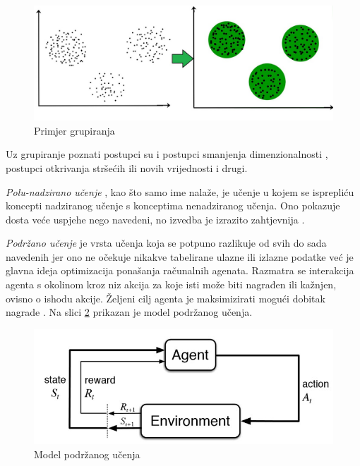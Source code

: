 \documentclass[times, utf8, zavrsni]{fer}
\begin{document}
\begin{figure}[H]
    \centering
    \includegraphics[scale=0.75]{img/clustering.jpg}
    \caption[Caption for LOF]{Primjer grupiranja\footnotemark}
    \label{fig:clustering}
\end{figure}

Uz grupiranje poznati postupci su i postupci smanjenja dimenzionalnosti , postupci otkrivanja stršećih ili novih vrijednosti  i drugi.

\bigskip

\textit{Polu-nadzirano učenje} , kao što samo ime nalaže, je učenje u kojem se isprepliću koncepti nadziranog učenje s konceptima nenadziranog učenja. Ono pokazuje dosta veće uspjehe nego navedeni, no izvedba je izrazito zahtjevnija \citep{wiki:SEMISUP}.

\bigskip

\textit{Podržano učenje}  je vrsta učenja koja se potpuno razlikuje od svih do sada navedenih jer ono ne očekuje nikakve tabelirane ulazne ili izlazne podatke već je glavna ideja optimizacija ponašanja računalnih agenata. Razmatra se interakcija agenta s okolinom  kroz niz akcija za koje isti može biti nagrađen ili kažnjen, ovisno o ishodu akcije. Željeni cilj agenta je maksimizirati mogući dobitak nagrade \citep{wiki:RL}. Na slici \ref{fig:reinforcement-learning} prikazan je model podržanog učenja.

\begin{figure}[H]
    \centering
    \includegraphics[scale=0.7]{img/reinforcement-learning.jpg}
    \caption[Caption for LOF]{Model podržanog učenja\footnotemark}
    \label{fig:reinforcement-learning}
\end{figure}
\end{document}
